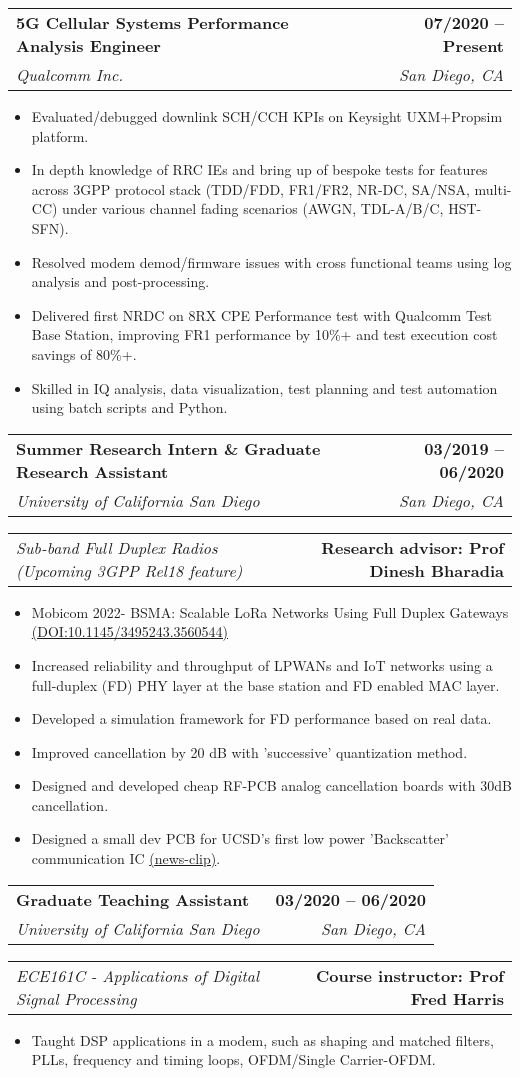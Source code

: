\documentclass[letterpaper,11pt]{article}
\makeatletter
\newcommand{\resumeItem}[1]{
  \item\small{
    {#1 \vspace{-2pt}}
  }
}
\newcommand{\resumeSubheading}[4]{
  \vspace{-2pt}\item
    \begin{tabular*}{1.0\textwidth}[t]{l@{\extracolsep{\fill}}r}
      \textbf{#1} & \textbf{\small #2} \\
      \textit{\small#3} & \textit{\small #4} \\
    \end{tabular*}\vspace{-7pt}
}
\newcommand{\resumeProjectHeading}[2]{
    \item
    \begin{tabular*}{1.001\textwidth}{l@{\extracolsep{\fill}}r}
      \small#1 & \textbf{\small #2}\\
    \end{tabular*}\vspace{-7pt}
}
\newcommand{\resumeItemListStart}{\begin{itemize}}
\newcommand{\resumeItemListEnd}{\end{itemize}\vspace{-5pt}}
\makeatother
\begin{document}
    \resumeSubheading
      {5G Cellular Systems Performance Analysis Engineer}{07/2020 -- Present}
      {Qualcomm Inc.}{San Diego, CA}
      \resumeItemListStart
        \resumeItem{Evaluated/debugged downlink SCH/CCH KPIs on Keysight UXM+Propsim platform.}
        \resumeItem{In depth knowledge of RRC IEs and bring up of bespoke tests for features across 3GPP protocol stack (TDD/FDD, FR1/FR2, NR-DC, SA/NSA, multi-CC) under various channel fading scenarios (AWGN, TDL-A/B/C, HST-SFN).}
        \resumeItem{Resolved modem demod/firmware issues with cross functional teams using log analysis and post-processing.}
        \resumeItem{Delivered first NRDC on 8RX CPE Performance test with Qualcomm Test Base Station, improving FR1 performance by 10\%+ and test execution cost savings of 80\%+.}
        \resumeItem{Skilled in IQ analysis, data visualization, test planning and test automation using batch scripts and Python.}
      \resumeItemListEnd
    \resumeSubheading
      {Summer Research Intern \& Graduate Research Assistant}{03/2019 -- 06/2020}
      {University of California San Diego}{San Diego, CA}
      \vspace{-20pt}
      \resumeProjectHeading
          {\textit{\small Sub-band Full Duplex Radios (Upcoming 3GPP Rel18 feature)}}{Research advisor: Prof Dinesh Bharadia}
      \resumeItemListStart
        \resumeItem{Mobicom 2022- BSMA: Scalable LoRa Networks Using Full Duplex Gateways \href{https://mobicom22.hotcrp.com/doc/mobicom22-final738.pdf?cap=hcav738AGhBgfFTdujnxeFgeubzndYa}{(DOI:10.1145/3495243.3560544)}}
        \resumeItem{Increased reliability and throughput of LPWANs and IoT networks using a full-duplex (FD) PHY layer at the base station and FD enabled MAC layer.}
        \resumeItem{Developed a simulation framework for FD performance based on real data.}
        \resumeItem{Improved cancellation by 20 dB with 'successive' quantization method.}
        \resumeItem{Designed and developed cheap RF-PCB analog cancellation boards with 30dB cancellation.}
        \resumeItem{Designed a small dev PCB for UCSD’s first low power 'Backscatter' communication IC \href{https://today.ucsd.edu/index_redis_default_site.php?/story/new-chip-brings-ultra-low-power-wi-fi-connectivity-to-iot-devices&/pressrelease/new-chip-brings-ultra-low-power-wi-fi-connectivity-to-iot-devices}{(news-clip)}.}
    \resumeItemListEnd
    
    \resumeSubheading
      {Graduate Teaching Assistant}{03/2020 -- 06/2020}
      {University of California San Diego}{San Diego, CA}
            \vspace{-20pt}
      \resumeProjectHeading
          {\textit{\small ECE161C - Applications of Digital Signal Processing}}{Course instructor: Prof Fred Harris}
      \resumeItemListStart
        \resumeItem{Taught DSP applications in a modem, such as shaping and matched filters, PLLs, frequency and timing loops, OFDM/Single Carrier-OFDM.}
    \resumeItemListEnd
\end{document}
